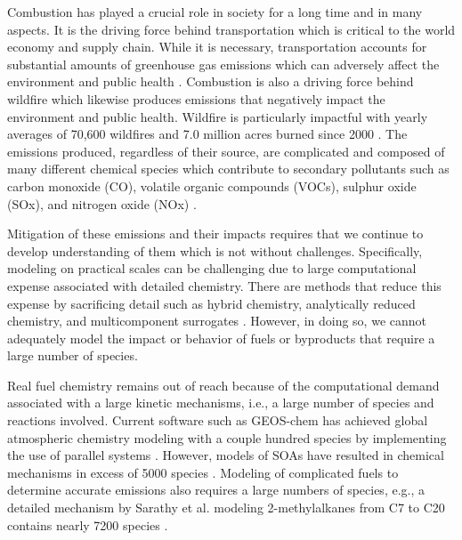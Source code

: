 

Combustion has played a crucial role in society for a long time and in many aspects.
It is the driving force behind transportation which is critical to the world economy and supply chain.
While it is necessary, transportation accounts for substantial amounts of greenhouse gas emissions which can adversely affect the environment and public health \cite{van_fan_review_2018, manisalidis_environmental_2020}.
Combustion is also a driving force behind wildfire which likewise produces emissions that negatively impact the environment and public health.
Wildfire is particularly impactful with yearly averages of 70,600 wildfires and 7.0 million acres burned since 2000 \cite{hoover_wildfire_2021}.
The emissions produced, regardless of their source, are complicated and composed of many different chemical species which contribute to secondary pollutants such as carbon monoxide (CO), volatile organic compounds (VOCs), sulphur oxide (SOx), and nitrogen oxide (NOx) \cite{van_fan_review_2018}.

Mitigation of these emissions and their impacts requires that we continue to develop understanding of them which is not without challenges.
Specifically, modeling on practical scales can be challenging due to large computational expense associated with detailed chemistry.
There are methods that reduce this expense by sacrificing detail such as hybrid chemistry, analytically reduced chemistry, and multicomponent surrogates \cite{felden_including_2016}.
However, in doing so, we cannot adequately model the impact or behavior of fuels or byproducts that require a large number of species.

Real fuel chemistry remains out of reach because of the computational demand associated with a large kinetic mechanisms, i.e., a large number of species and reactions involved.
Current software such as GEOS-chem has achieved global atmospheric chemistry modeling with a couple hundred species by implementing the use of parallel systems \cite{eastham_geos-chem_2018}.
However, models of SOAs have resulted in chemical mechanisms in excess of 5000 species \cite{li_modeling_2015}.
Modeling of complicated fuels to determine accurate emissions also requires a large numbers of species, e.g., a detailed mechanism by Sarathy et al. modeling 2-methylalkanes from C7 to C20 contains nearly 7200 species \cite{sarathy_comprehensive_2011}.

